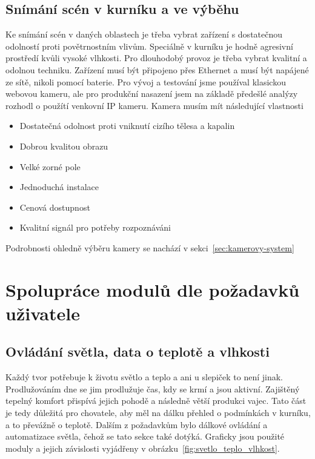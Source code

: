 \subsection{Snímání scén v kurníku a ve výběhu}
Ke snímání scén v daných oblastech je třeba vybrat zařízení s dostatečnou odolností proti povětrnostním vlivům.
Speciálně v kurníku je hodně agresivní prostředí kvůli vysoké vlhkosti.
Pro dlouhodobý provoz je třeba vybrat kvalitní a odolnou techniku.
Zařízení musí být připojeno přes Ethernet a musí být napájené ze sítě, nikoli pomocí baterie.
Pro vývoj a testování jsme používal klasickou webovou kameru, ale pro produkční nasazení jsem na základě předešlé analýzy rozhodl o použítí venkovní IP kameru.
Kamera musím mít následující vlastnosti
\begin{itemize}
    \item Dostatečná odolnost proti vniknutí cizího tělesa a kapalin
    \item Dobrou kvalitou obrazu
    \item Velké zorné pole
    \item Jednoduchá instalace
    \item Cenová dostupnost
    \item Kvalitní signál pro potřeby rozpoznáváni
\end{itemize}
Podrobnosti ohledně výběru kamery se nachází v sekci~\ref{sec:kamerovy-system}

\section{Spolupráce modulů dle požadavků uživatele}\label{sec:schematicka-vyjadreni-zavislosti-jednotlivych-modulu}

\subsection{Ovládání světla, data o teplotě a vlhkosti}
Každý tvor potřebuje k životu světlo a teplo a ani u slepiček to není jinak.
Prodlužováním dne se jim prodlužuje čas, kdy se krmí a jsou aktivní.
Zajištěný tepelný komfort přispívá jejich pohodě a následně větší produkci vajec.
Tato část je tedy důležitá pro chovatele, aby měl na dálku přehled o podmínkách v kurníku, a to převážně o teplotě.
Dalším z požadavkům bylo dálkové ovládání a automatizace světla, čehož se tato sekce také dotýká.
Graficky jsou použité moduly a jejich závislosti vyjádřeny v obrázku~\ref{fig:svetlo_teplo_vlhkost}.\newline

